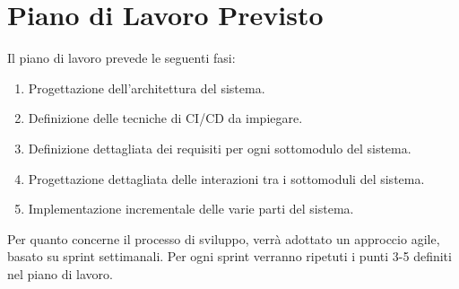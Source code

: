 \documentclass[12pt,a4paper,openright,twoside]{book}
\begin{document}
\chapter{Piano di Lavoro Previsto}
\label{chap:expectedWorkPlan}

Il piano di lavoro prevede le seguenti fasi:

\begin{enumerate}
    \item Progettazione dell'architettura del sistema.
    \item Definizione delle tecniche di CI/CD da impiegare.
    \item Definizione dettagliata dei requisiti per ogni sottomodulo del sistema.
    \item Progettazione dettagliata delle interazioni tra i sottomoduli del sistema.
    \item Implementazione incrementale delle varie parti del sistema.
\end{enumerate}

Per quanto concerne il processo di sviluppo, verrà adottato un approccio agile, basato su sprint settimanali. Per ogni sprint verranno ripetuti i punti 3-5 definiti nel piano di lavoro.


%
%
\end{document}
